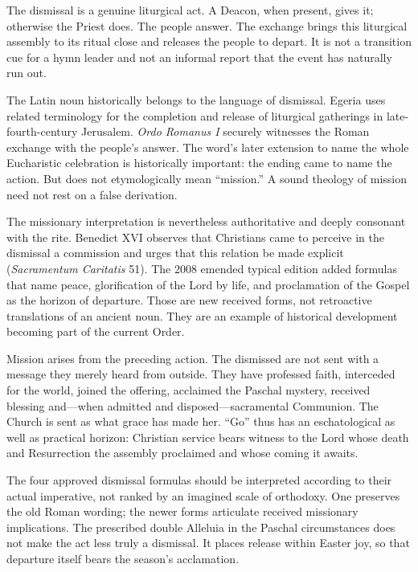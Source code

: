 The dismissal is a genuine liturgical act. A Deacon, when present, gives it; otherwise the Priest does. The people answer. The exchange brings this liturgical assembly to its ritual close and releases the people to depart. It is not a transition cue for a hymn leader and not an informal report that the event has naturally run out.

The Latin noun  historically belongs to the language of dismissal. Egeria uses related terminology for the completion and release of liturgical gatherings in late-fourth-century Jerusalem. \emph{Ordo Romanus I} securely witnesses the Roman exchange  with the people's answer. The word's later extension to name the whole Eucharistic celebration is historically important: the ending came to name the action. But  does not etymologically mean ``mission.'' A sound theology of mission need not rest on a false derivation.

The missionary interpretation is nevertheless authoritative and deeply consonant with the rite. Benedict XVI observes that Christians came to perceive in the dismissal a commission and urges that this relation be made explicit (\emph{Sacramentum Caritatis} 51). The 2008 emended typical edition added formulas that name peace, glorification of the Lord by life, and proclamation of the Gospel as the horizon of departure. Those are new received forms, not retroactive translations of an ancient noun. They are an example of historical development becoming part of the current Order.

Mission arises from the preceding action. The dismissed are not sent with a message they merely heard from outside. They have professed faith, interceded for the world, joined the offering, acclaimed the Paschal mystery, received blessing and---when admitted and disposed---sacramental Communion. The Church is sent as what grace has made her. ``Go'' thus has an eschatological as well as practical horizon: Christian service bears witness to the Lord whose death and Resurrection the assembly proclaimed and whose coming it awaits.

The four approved dismissal formulas should be interpreted according to their actual imperative, not ranked by an imagined scale of orthodoxy. One preserves the old Roman wording; the newer forms articulate received missionary implications. The prescribed double Alleluia in the Paschal circumstances does not make the act less truly a dismissal. It places release within Easter joy, so that departure itself bears the season's acclamation.


